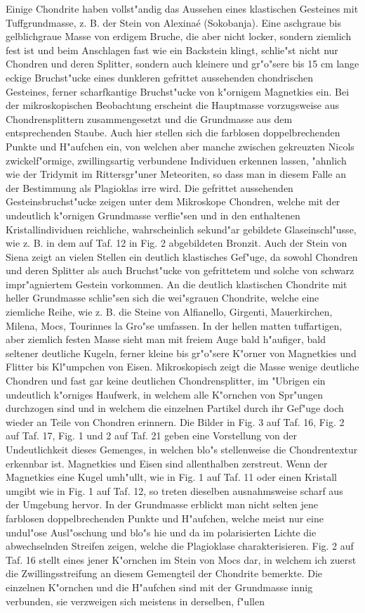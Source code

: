 \documentclass[a4paper, 11pt, oneside, polutonikogreek, german]{article}
\begin{document}
Einige Chondrite haben vollst"andig das Aussehen eines klastischen Gesteines mit Tuffgrundmasse, z. B. der Stein von Alexinaé (Sokobanja). Eine aschgraue bis gelblichgraue Masse von erdigem Bruche, die aber nicht locker, sondern ziemlich fest ist und beim Anschlagen fast wie ein Backstein klingt, schlie"st nicht nur Chondren und deren Splitter, sondern auch kleinere und gr"o"sere bis 15 cm lange eckige Bruchst"ucke eines dunkleren gefrittet aussehenden chondrischen Gesteines, ferner scharfkantige Bruchst"ucke von k"ornigem Magnetkies ein. Bei der mikroskopischen Beobachtung erscheint die Hauptmasse vorzugsweise aus Chondrensplittern zusammengesetzt und die Grundmasse aus dem entsprechenden Staube. Auch hier stellen sich die farblosen doppelbrechenden Punkte und H"aufchen ein, von welchen aber manche zwischen gekreuzten Nicols zwickelf"ormige, zwillingsartig verbundene Individuen erkennen lassen, "ahnlich wie der Tridymit im Rittersgr"uner Meteoriten, so dass man in diesem Falle an der Bestimmung als Plagioklas irre wird. Die gefrittet aussehenden Gesteinsbruchst"ucke zeigen unter dem Mikroskope Chondren, welche mit der undeutlich k"ornigen Grundmasse verflie"sen und in den enthaltenen Kristallindividuen reichliche, wahrscheinlich sekund"ar gebildete Glaseinschl"usse, wie z. B. in dem auf Taf. 12 in Fig. 2 abgebildeten Bronzit. Auch der Stein von Siena zeigt an vielen Stellen ein deutlich klastisches Gef"uge, da sowohl Chondren und deren Splitter als auch Bruchst"ucke von gefrittetem und solche von schwarz impr"agniertem Gestein vorkommen. An die deutlich klastischen Chondrite mit heller Grundmasse schlie"sen sich die wei"sgrauen Chondrite, welche eine ziemliche Reihe, wie z. B. die Steine von Alfianello, Girgenti, Mauerkirchen, Milena, Mocs, Tourinnes la Gro"se umfassen. In der hellen matten tuffartigen, aber ziemlich festen Masse sieht man mit freiem Auge bald h"aufiger, bald seltener deutliche Kugeln, ferner kleine bis gr"o"sere K"orner von Magnetkies und Flitter bis Kl"umpchen von Eisen. Mikroskopisch zeigt die Masse wenige deutliche Chondren und fast gar keine deutlichen Chondrensplitter, im "Ubrigen ein undeutlich k"orniges Haufwerk, in welchem alle K"ornchen von Spr"ungen durchzogen sind und in welchem die einzelnen Partikel durch ihr Gef"uge doch wieder an Teile von Chondren erinnern. Die Bilder in Fig. 3 auf Taf. 16, Fig. 2 auf Taf. 17, Fig. 1 und 2 auf Taf. 21 geben eine Vorstellung von der Undeutlichkeit dieses Gemenges, in welchen blo"s stellenweise die Chondrentextur erkennbar ist. Magnetkies und Eisen sind allenthalben zerstreut. Wenn der Magnetkies eine Kugel umh"ullt, wie in Fig. 1 auf Taf. 11 oder einen Kristall umgibt wie in Fig. 1 auf Taf. 12, so treten dieselben ausnahmsweise scharf aus der Umgebung hervor. In der Grundmasse erblickt man nicht selten jene farblosen doppelbrechenden Punkte und H"aufchen, welche meist nur eine undul"ose Ausl"oschung und blo"s hie und da im polarisierten Lichte die abwechselnden Streifen zeigen, welche die Plagioklase charakterisieren. Fig. 2 auf Taf. 16 stellt eines jener K"ornchen im Stein von Mocs dar, in welchem ich zuerst die Zwillingsstreifung an diesem Gemengteil der Chondrite bemerkte. Die einzelnen K"ornchen und die H"aufchen sind mit der Grundmasse innig verbunden, sie verzweigen sich meistens in derselben, f"ullen 
\end{document}
